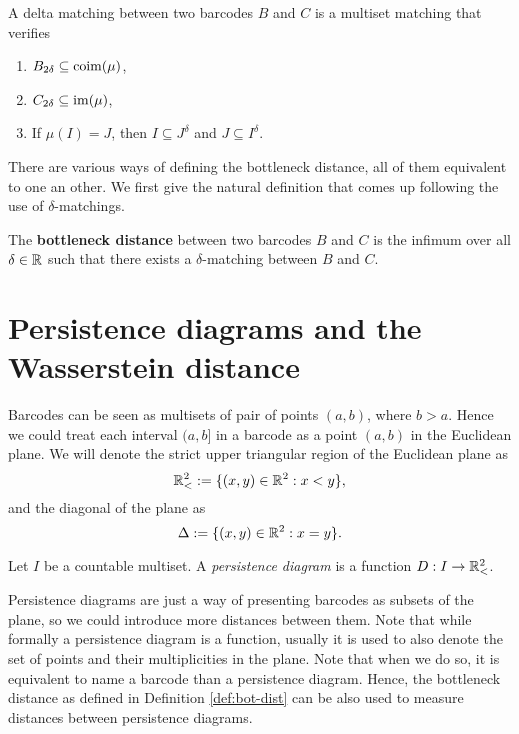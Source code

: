 \begin{definition} \label{delta-matching}
    A delta matching between two barcodes $ B $ and $ C $ is a multiset matching that verifies
    \begin{enumerate}
        \item $B_{2\delta} \subseteq \operatorname{coim}(\mu) $,
        \item $C_{2\delta} \subseteq \operatorname{im}(\mu) $,
        \item If $\mu(I) = J$, then $I \subseteq J^\delta$ and $J \subseteq I^\delta$.
    \end{enumerate}
\end{definition}

There are various ways of defining the bottleneck distance, all of them equivalent to one an other. We first give the natural definition that comes up following the use of $\delta$-matchings.

\begin{definition} \label{def:bot-dist}
    The {\bf bottleneck distance} between two barcodes $ B $ and $ C $ is the infimum over all $ \delta \in \mathbb R $ such that there exists a $\delta$-matching between $ B $ and $ C $.
\end{definition}

\section{Persistence diagrams and the Wasserstein distance} \label{sec:preliminaries-wp-persistance}
Barcodes can be seen as multisets of pair of points $ (a, b) $, where $ b > a $. Hence we could treat each interval $ (a, b] $ in a barcode as a point $ (a, b) $ in the Euclidean plane. We will denote the strict upper triangular region of the Euclidean plane as
\begin{equation}
   \mathbb{R}_<^2 := \{(x, y) \in \mathbb R^2 : x < y\}, 
\end{equation}
and the diagonal of the plane as
\begin{equation}
    \Delta := \{(x, y) \in \mathbb R^2 : x = y\}.
\end{equation}

\begin{definition}
    Let $ I $ be a countable multiset. A {\it persistence diagram} is a function $ D: I \to \mathbb{R}_<^2 $.
\end{definition}

Persistence diagrams are just a way of presenting barcodes as subsets of the plane, so we could introduce more distances between them. Note that while formally a persistence diagram is a function, usually it is used to also denote the set of points and their multiplicities in the plane. Note that when we do so, it is equivalent to name a barcode than a persistence diagram. Hence, the bottleneck distance as defined in Definition \ref{def:bot-dist} can be also used to measure distances between persistence diagrams.

